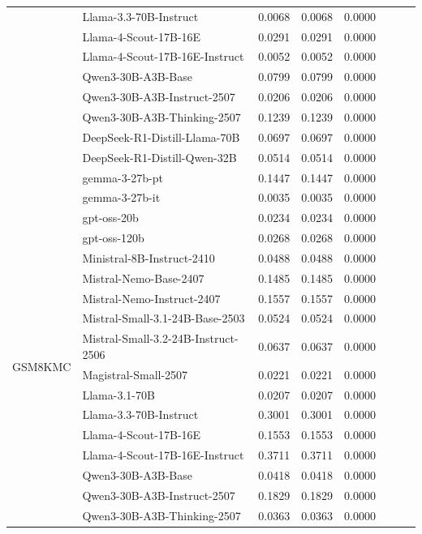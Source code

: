 \begin{table}[h]
{\begin{tabular}{l|lcccc|cc}
        & Llama-3.3-70B-Instruct & 0.0068 & 0.0068 & 0.0000 \\
        & Llama-4-Scout-17B-16E & 0.0291 & 0.0291 & 0.0000 \\
        & Llama-4-Scout-17B-16E-Instruct & 0.0052 & 0.0052 & 0.0000 \\
        & Qwen3-30B-A3B-Base & 0.0799 & 0.0799 & 0.0000 \\
        & Qwen3-30B-A3B-Instruct-2507 & 0.0206 & 0.0206 & 0.0000 \\
        & Qwen3-30B-A3B-Thinking-2507 & 0.1239 & 0.1239 & 0.0000 \\
        & DeepSeek-R1-Distill-Llama-70B & 0.0697 & 0.0697 & 0.0000 \\
        & DeepSeek-R1-Distill-Qwen-32B & 0.0514 & 0.0514 & 0.0000 \\
        & gemma-3-27b-pt & 0.1447 & 0.1447 & 0.0000 \\
        & gemma-3-27b-it & 0.0035 & 0.0035 & 0.0000 \\
        \midrule
        \multirow{19}{*}{GSM8KMC} & gpt-oss-20b & 0.0234 & 0.0234 & 0.0000 \\
        & gpt-oss-120b & 0.0268 & 0.0268 & 0.0000 \\
        & Ministral-8B-Instruct-2410 & 0.0488 & 0.0488 & 0.0000 \\
        & Mistral-Nemo-Base-2407 & 0.1485 & 0.1485 & 0.0000 \\
        & Mistral-Nemo-Instruct-2407 & 0.1557 & 0.1557 & 0.0000 \\
        & Mistral-Small-3.1-24B-Base-2503 & 0.0524 & 0.0524 & 0.0000 \\
        & Mistral-Small-3.2-24B-Instruct-2506 & 0.0637 & 0.0637 & 0.0000 \\
        & Magistral-Small-2507 & 0.0221 & 0.0221 & 0.0000 \\
        & Llama-3.1-70B & 0.0207 & 0.0207 & 0.0000 \\
        & Llama-3.3-70B-Instruct & 0.3001 & 0.3001 & 0.0000 \\
        & Llama-4-Scout-17B-16E & 0.1553 & 0.1553 & 0.0000 \\
        & Llama-4-Scout-17B-16E-Instruct & 0.3711 & 0.3711 & 0.0000 \\
        & Qwen3-30B-A3B-Base & 0.0418 & 0.0418 & 0.0000 \\
        & Qwen3-30B-A3B-Instruct-2507 & 0.1829 & 0.1829 & 0.0000 \\
        & Qwen3-30B-A3B-Thinking-2507 & 0.0363 & 0.0363 & 0.0000 \\

\end{tabular}}
\end{table}
